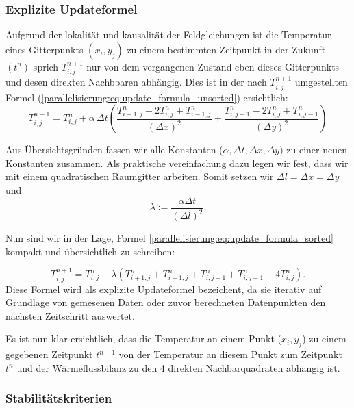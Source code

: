 \subsubsection{Explizite Updateformel}
\label{parallelisierung:sec:update_formel}


Aufgrund der lokalität und kausalität der Feldgleichungen ist die Temperatur eines Gitterpunkts \( (x_i, y_j)\) zu einem bestimmten Zeitpunkt in der Zukunft \( (t^n)\) sprich \(T_{i,j}^{n+1}\) nur von dem  vergangenen Zustand eben dieses Gitterpunkts und desen direkten Nachbbaren abhängig.
Dies ist  in der nach \(T_{i,j}^{n+1}\) umgestellten Formel (\ref{parallelisierung:eq:update_formula_unsorted}) ersichtlich:
\begin{equation}
	\label{parallelisierung:eq:update_formula_sorted}
	T_{i,j}^{n+1}
	=
	T_{i,j}^n
	+
	\alpha \, \Delta t \left(
	\frac{T_{i+1,j}^n - 2 T_{i,j}^n + T_{i-1,j}^n}{(\Delta x)^2}
	+
	\frac{T_{i,j+1}^n - 2 T_{i,j}^n + T_{i,j-1}^n}{(\Delta y)^2}
	\right)
\end{equation}

Aus Übersichtsgründen fassen wir alle Konstanten (\(\alpha, \Delta t, \Delta x, \Delta y) \) zu einer neuen Konstanten zusammen.
Als praktische vereinfachung dazu legen wir fest, dass wir mit einem quadratischen Raumgitter arbeiten. Somit setzen wir  \(\Delta l = \Delta x = \Delta y\) und
\begin{equation}
	\label{parallelisierung:eq:lambda}
	\lambda 
	:= 
	\frac{\alpha \Delta t}{(\Delta l)^2}.
\end{equation}

Nun sind wir in der Lage, Formel \eqref{parallelisierung:eq:update_formula_sorted} kompakt und übersichtlich zu schreiben:

\begin{equation}
	\label{parallelisierung:eq:update_formel}
	T_{i,j}^{n+1}
	=
	T_{i,j}^n +
	\lambda \left(
	T_{i+1,j}^n + T_{i-1,j}^n + T_{i,j+1}^n + T_{i,j-1}^n - 4 T_{i,j}^n
	\right).
\end{equation}
Diese Formel wird als explizite Updateformel bezeichent, da sie iterativ auf Grundlage von gemesenen Daten oder zuvor berechneten Datenpunkten den nächsten Zeitschritt auswertet.

Es ist nun klar ersichtlich, dass die Temperatur an einem Punkt (\(x_i, y_j\)) zu einem gegebenen Zeitpunkt \(t^{n+1}\)  von der Temperatur an diesem Punkt zum Zeitpunkt \(t^n\) und der Wärmeflussbilanz zu den 4 direkten Nachbarquadraten abhängig ist.

\subsubsection{Stabilitätskriterien}

